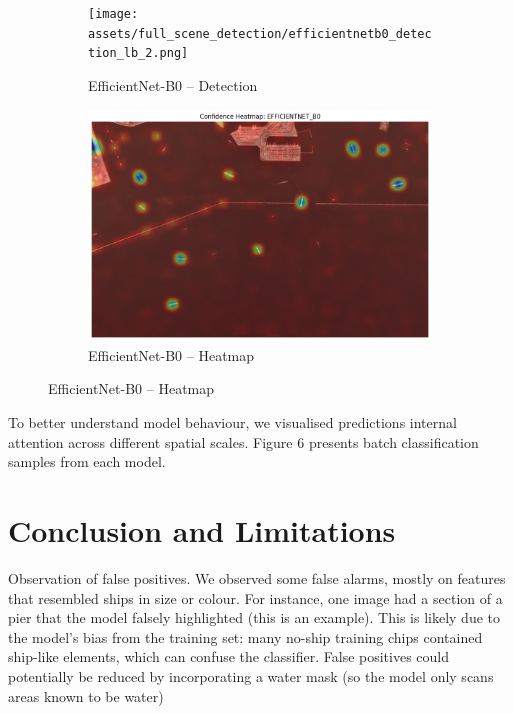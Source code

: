 \documentclass[11pt]{article}
\begin{document}
\begin{figure}[H]
		\begin{subfigure}[b]{0.49\textwidth}
			\centering
			\texttt{[image: assets/full\_scene\_detection/efficientnetb0\_detection\_lb\_2.png]}
			\caption{EfficientNet-B0 – Detection}
		\end{subfigure}
		\hfill
		\begin{subfigure}[b]{0.49\textwidth}
			\centering
			\includegraphics[width=\textwidth]{assets/confidence_heatmap/efficientnet_b0_confidence_heatmap.png}
			\caption{EfficientNet-B0 – Heatmap}
		\end{subfigure}

	\end{figure}
	
	To better understand model behaviour, we visualised predictions internal attention across different spatial scales. Figure 6 presents batch classification samples from each model. 
	
	\section*{Conclusion and Limitations}
	
	Observation of false positives. We observed some false alarms, mostly on features that resembled ships in size or colour. For instance, one image had a section of a pier that the model falsely highlighted (this is an example). This is likely due to the model's bias from the training set: many no-ship training chips contained ship-like elements, which can confuse the classifier.
	False positives could potentially be reduced by incorporating a water mask (so the model only scans areas known to be water)
	
\end{document}
